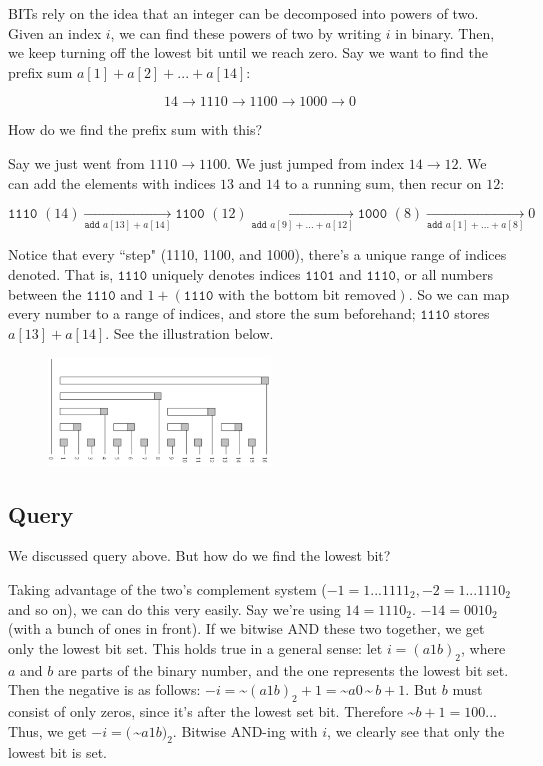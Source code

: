 \documentclass{article}
\begin{document}
    BITs rely on the idea that an integer can be decomposed into powers of two. Given an index $i$, we can find these powers of two by writing $i$ in binary. Then, we keep turning off the lowest bit until we reach zero. Say we want to find the prefix sum $a[1]+a[2]+...+a[14]$:
    
    $$ 14 \rightarrow 1110 \rightarrow 1100 \rightarrow 1000 \rightarrow 0 $$
    
    How do we find the prefix sum with this?
    
    Say we just went from $1110 \rightarrow 1100$. We just jumped from index $14 \rightarrow 12$. We can add the elements with indices $13$ and $14$ to a running sum, then recur on $12$:
    
    $$ \texttt{1110 }(14) \xrightarrow[{\texttt{add } a[13]+a[14]}]{} \texttt{1100 }(12) \xrightarrow[{\texttt{add } a[9]+...+a[12]}]{} \texttt{1000 }(8) \xrightarrow[{\texttt{add } a[1]+...+a[8]}]{} 0 $$
    
    Notice that every ``step" (1110, 1100, and 1000), there's a unique range of indices denoted. That is, $\texttt{1110}$ uniquely denotes indices $\texttt{1101}$ and $\texttt{1110}$, or all numbers between the $\texttt{1110}$ and $1+(\texttt{1110} \text{ with the bottom bit removed})$. So we can map every number to a range of indices, and store the sum beforehand; $\texttt{1110}$ stores $a[13]+a[14]$. See the illustration below.

    \begin{figure}
      \center
      \includegraphics[width=0.525\textwidth]{BIT.PNG}
    \end{figure}
    
    \subsection{Query}
        We discussed query above. But how do we find the lowest bit?
        
        Taking advantage of the two's complement system ($-1 = 1...1111_2, -2 = 1...1110_2$ and so on), we can do this very easily. Say we're using $14 = 1110_2$. $-14 = 0010_2$ (with a bunch of ones in front). If we bitwise AND these two together, we get only the lowest bit set. This holds true in a general sense: let $i = (a1b)_2$, where $a$ and $b$ are parts of the binary number, and the one represents the lowest bit set. Then the negative is as follows: $-i = $\textasciitilde$(a1b)_2 + 1 = $\textasciitilde$ a0\,$\textasciitilde$ \,b + 1$. But $b$ must consist of only zeros, since it's after the lowest set bit. Therefore \textasciitilde $b + 1 = 100...$ Thus, we get $-i = (\,$\textasciitilde$ a1b)_2$. Bitwise AND-ing with $i$, we clearly see that only the lowest bit is set.
        
\end{document}
